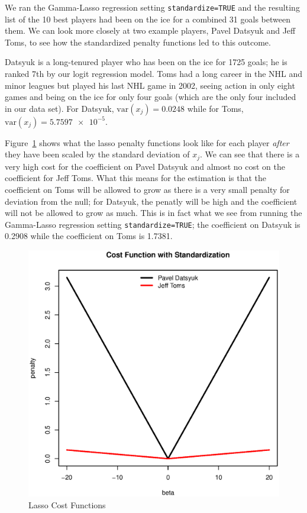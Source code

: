 \documentclass[11pt, fleqn]{article}
\begin{document}
We ran the Gamma-Lasso regression setting \texttt{standardize=TRUE} and the resulting list of the 10 best players had been on the ice for a combined 31 goals between them. We can look more closely at two example players, Pavel Datsyuk and Jeff Toms, to see how the standardized penalty functions led to this outcome.

Datsyuk is a long-tenured player who has been on the ice for 1725 goals; he is ranked 7th by our logit regression model. Toms had a long career in the NHL and minor leagues but played his last NHL game in 2002, seeing action in only eight games and being on the ice for only four goals (which are the only four included in our data set). For Datsyuk, $\mathrm{var}(x_j)=0.0248$ while for Toms, $\mathrm{var}(x_j)=\num{5.7597e-5}$.

Figure~\ref{fig:cost_fcn} shows what the lasso penalty functions look like for each player \textit{after} they have been scaled by the standard deviation of $x_j$. We can see that there is a very high cost for the coefficient on Pavel Datsyuk and almost no cost on the coefficient for Jeff Toms. What this means for the estimation is that the coefficient on Toms will be allowed to grow as there is a very small penalty for deviation from the null; for Datsyuk, the penatly will be high and the coefficient will not be allowed to grow as much. This is in fact what we see from running the Gamma-Lasso regression setting \texttt{standardize=TRUE}; the coefficient on Datsyuk is 0.2908 while the coefficient on Toms is 1.7381.

\begin{figure}[!htb]
  \centering
  \includegraphics[scale=.5]{cost_fcn.eps}
  \caption{Lasso Cost Functions}
  \label{fig:cost_fcn}
\end{figure}
\end{document}
